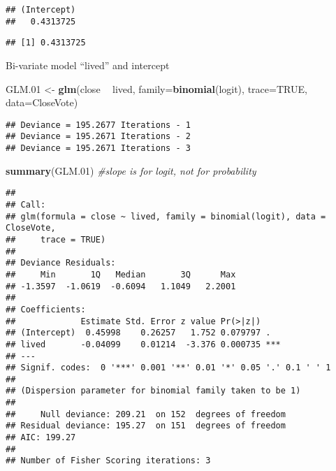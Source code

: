\documentclass[
]{article}
\newenvironment{Shaded}{\begin{snugshade}}{\end{snugshade}}
\newcommand{\CommentTok}[1]{\textcolor[rgb]{0.56,0.35,0.01}{\textit{#1}}}
\newcommand{\DataTypeTok}[1]{\textcolor[rgb]{0.13,0.29,0.53}{#1}}
\newcommand{\DecValTok}[1]{\textcolor[rgb]{0.00,0.00,0.81}{#1}}
\newcommand{\FloatTok}[1]{\textcolor[rgb]{0.00,0.00,0.81}{#1}}
\newcommand{\KeywordTok}[1]{\textcolor[rgb]{0.13,0.29,0.53}{\textbf{#1}}}
\newcommand{\NormalTok}[1]{#1}
\newcommand{\OperatorTok}[1]{\textcolor[rgb]{0.81,0.36,0.00}{\textbf{#1}}}
\newcommand{\OtherTok}[1]{\textcolor[rgb]{0.56,0.35,0.01}{#1}}
\newcommand{\StringTok}[1]{\textcolor[rgb]{0.31,0.60,0.02}{#1}}
\begin{document}
\begin{verbatim}
## (Intercept) 
##   0.4313725
\end{verbatim}

\begin{Shaded}
\end{Shaded}

\begin{verbatim}
## [1] 0.4313725
\end{verbatim}

Bi-variate model ``lived'' and intercept

\begin{Shaded}
\begin{Highlighting}[]
\NormalTok{GLM}\FloatTok{.01}\NormalTok{ <-}\StringTok{ }\KeywordTok{glm}\NormalTok{(close }\OperatorTok{~}\StringTok{ }\NormalTok{lived, }\DataTypeTok{family=}\KeywordTok{binomial}\NormalTok{(logit), }\DataTypeTok{trace=}\OtherTok{TRUE}\NormalTok{, }\DataTypeTok{data=}\NormalTok{CloseVote)}
\end{Highlighting}
\end{Shaded}

\begin{verbatim}
## Deviance = 195.2677 Iterations - 1
## Deviance = 195.2671 Iterations - 2
## Deviance = 195.2671 Iterations - 3
\end{verbatim}

\begin{Shaded}
\begin{Highlighting}[]
\KeywordTok{summary}\NormalTok{(GLM}\FloatTok{.01}\NormalTok{)  }\CommentTok{#slope is for logit, not for probability}
\end{Highlighting}
\end{Shaded}

\begin{verbatim}
## 
## Call:
## glm(formula = close ~ lived, family = binomial(logit), data = CloseVote, 
##     trace = TRUE)
## 
## Deviance Residuals: 
##     Min       1Q   Median       3Q      Max  
## -1.3597  -1.0619  -0.6094   1.1049   2.2001  
## 
## Coefficients:
##             Estimate Std. Error z value Pr(>|z|)    
## (Intercept)  0.45998    0.26257   1.752 0.079797 .  
## lived       -0.04099    0.01214  -3.376 0.000735 ***
## ---
## Signif. codes:  0 '***' 0.001 '**' 0.01 '*' 0.05 '.' 0.1 ' ' 1
## 
## (Dispersion parameter for binomial family taken to be 1)
## 
##     Null deviance: 209.21  on 152  degrees of freedom
## Residual deviance: 195.27  on 151  degrees of freedom
## AIC: 199.27
## 
## Number of Fisher Scoring iterations: 3
\end{verbatim}
\end{document}
